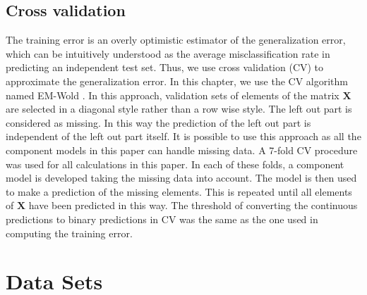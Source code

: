 \subsection{Cross validation}
The training error is an overly optimistic estimator of the generalization error, which can be intuitively understood as the average misclassification rate in predicting an independent test set. Thus, we use cross validation (CV) to approximate the generalization error. In this chapter, we use the CV algorithm named EM-Wold \cite{wold1978cross,Bro2008}. In this approach, validation sets of elements of the matrix $\mathbf{X}$ are selected in a diagonal style rather than a row wise style. The left out part is considered as missing. In this way the prediction of the left out part is independent of the left out part itself. It is possible to use this approach as all the component models in this paper can handle missing data. A 7-fold CV procedure was used for all calculations in this paper. In each of these folds, a component model is developed taking the missing data into account. The model is then used to make a prediction of the missing elements. This is repeated until all elements of $\mathbf{X}$ have been predicted in this way. The threshold of converting the continuous predictions to binary predictions in CV was the same as the one used in computing the training error. 

\section{Data Sets}
